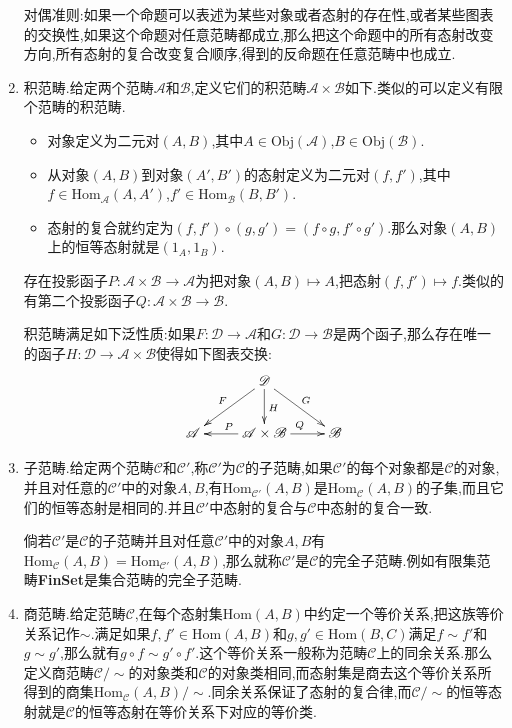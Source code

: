\begin{enumerate}
	对偶准则:如果一个命题可以表述为某些对象或者态射的存在性,或者某些图表的交换性,如果这个命题对任意范畴都成立,那么把这个命题中的所有态射改变方向,所有态射的复合改变复合顺序,得到的反命题在任意范畴中也成立.
	\item 积范畴.给定两个范畴$\mathscr{A}$和$\mathscr{B}$,定义它们的积范畴$\mathscr{A}\times\mathscr{B}$如下.类似的可以定义有限个范畴的积范畴.
	\begin{itemize}
		\item 对象定义为二元对$(A,B)$,其中$A\in\mathrm{Obj}(\mathscr{A})$,$B\in\mathrm{Obj}(\mathscr{B})$.
		\item 从对象$(A,B)$到对象$(A',B')$的态射定义为二元对$(f,f')$,其中$f\in\mathrm{Hom}_{\mathscr{A}}(A,A')$,$f'\in\mathrm{Hom}_{\mathscr{B}}(B,B')$.
		\item 态射的复合就约定为$(f,f')\circ(g,g')=(f\circ g,f'\circ g')$.那么对象$(A,B)$上的恒等态射就是$(1_A,1_B)$.
	\end{itemize}
	
	存在投影函子$P:\mathscr{A}\times\mathscr{B}\to\mathscr{A}$为把对象$(A,B)\mapsto A$,把态射$(f,f')\mapsto f$.类似的有第二个投影函子$Q:\mathscr{A}\times\mathscr{B}\to\mathscr{B}$.
	
	\qquad
	
	积范畴满足如下泛性质:如果$F:\mathscr{D}\to\mathscr{A}$和$G:\mathscr{D}\to\mathscr{B}$是两个函子,那么存在唯一的函子$H:\mathscr{D}\to\mathscr{A}\times\mathscr{B}$使得如下图表交换:
	$$\xymatrix{&\mathscr{D}\ar[dl]_F\ar[d]^H\ar[dr]^G&\\\mathscr{A}&\mathscr{A}\times\mathscr{B}\ar[l]_P\ar[r]^Q&\mathscr{B}}$$
	\item 子范畴.给定两个范畴$\mathscr{C}$和$\mathscr{C}'$,称$\mathscr{C}'$为$\mathscr{C}$的子范畴,如果$\mathscr{C}'$的每个对象都是$\mathscr{C}$的对象,并且对任意的$\mathscr{C}'$中的对象$A,B$,有$\mathrm{Hom}_{\mathscr{C'}}(A,B)$是$\mathrm{Hom}_{\mathscr{C}}(A,B)$的子集,而且它们的恒等态射是相同的.并且$\mathscr{C}'$中态射的复合与$\mathscr{C}$中态射的复合一致.
	
	\qquad
	
	倘若$\mathscr{C}'$是$\mathscr{C}$的子范畴并且对任意$\mathscr{C}'$中的对象$A,B$有$\mathrm{Hom}_{\mathscr{C}}(A,B)=\mathrm{Hom}_{\mathscr{C}'}(A,B)$,那么就称$\mathscr{C}'$是$\mathscr{C}$的完全子范畴.例如有限集范畴\textbf{FinSet}是集合范畴的完全子范畴.
	\item 商范畴.给定范畴$\mathscr{C}$,在每个态射集$\mathrm{Hom}(A,B)$中约定一个等价关系,把这族等价关系记作$\sim$.满足如果$f,f'\in\mathrm{Hom}(A,B)$和$g,g'\in\mathrm{Hom}(B,C)$满足$f\sim f'$和$g\sim g'$,那么就有$g\circ f\sim g'\circ f'$.这个等价关系一般称为范畴$\mathscr{C}$上的同余关系.那么定义商范畴$\mathscr{C}/\sim$的对象类和$\mathscr{C}$的对象类相同,而态射集是商去这个等价关系所得到的商集$\mathrm{Hom}_{\mathscr{C}}(A,B)/\sim$.同余关系保证了态射的复合律,而$\mathscr{C}/\sim$的恒等态射就是$\mathscr{C}$的恒等态射在等价关系下对应的等价类.
\end{enumerate}

